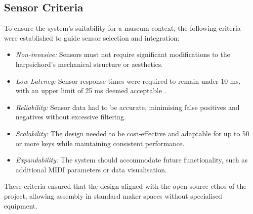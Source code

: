 
\subsection{Sensor Criteria}\label{sensor-criteria}

To ensure the system's suitability for a museum context, the following criteria were established to guide sensor selection and integration:

\begin{itemize}
    \item \emph{Non-invasive:} Sensors must not require significant modifications to the harpsichord's mechanical structure or aesthetics.
    \item \emph{Low Latency:} Sensor response times were required to remain under 10 ms, with an upper limit of 25 ms deemed acceptable \cite{Jack2016}.
    \item \emph{Reliability:} Sensor data had to be accurate, minimising false positives and negatives without excessive filtering.
    \item \emph{Scalability:} The design needed to be cost-effective and adaptable for up to 50 or more keys while maintaining consistent performance.
    \item \emph{Expandability:} The system should accommodate future functionality, such as additional MIDI parameters or data visualisation.
\end{itemize}

These criteria ensured that the design aligned with the open-source ethos of the project, allowing assembly in standard maker spaces without specialised equipment. 

